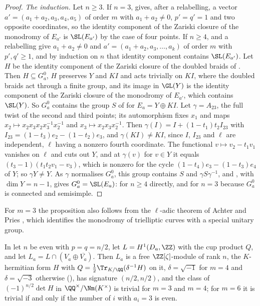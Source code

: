 \begin{proof}
\emph{The induction.} Let $n\ge3$. If $n=3$,  gives,
after a relabelling, a vector $a'=(a_{1}+a_{2},a_{3},a_{4},a_{5})$ of order $m$
with $a_{1}+a_{2}\ne0$, $p'=q'=1$ and two opposite coordinates, so the
identity component of the Zariski closure of the monodromy of $E_{a'}$ is
$\SL(E_{a'})$ by the case of four points. If $n\ge4$,  and
a relabelling give $a_{1}+a_{2}\ne0$ and $a'=(a_{1}+a_{2},a_{3},\dots,a_{k})$
of order $m$ with $p',q'\ge1$, and by induction on $n$ that identity
component contains $\SL(E_{a'})$. Let $H$ be the identity component of the
Zariski closure of the doubled braids of . Then
$H\subseteq G_{a}^{0}$, $H$ preserves $Y$ and $KI$ and acts trivially on
$KI$, where the doubled braids act through a finite group, and its image in
$\GL(Y)$ is the identity component of the Zariski closure of the monodromy of
$E_{a'}$, which contains $\SL(Y)$. So $G_{a}^{0}$ contains the group $S$ of
 for $E_{a}=Y\oplus KI$. Let $\gamma=A_{23}$, the full
twist of the second and third points; its automorphism fixes $x_{1}$ and
maps $x_{2}\mapsto x_{2}x_{3}x_{2}x_{3}^{-1}x_{2}^{-1}$ and $x_{3}\mapsto
x_{2}x_{3}x_{2}^{-1}$. Then $\gamma(I)=I+(1-t_{1})t_{2}I_{23}$ with
$I_{23}=(1-t_{3})e_{2}-(1-t_{2})e_{3}$, and $\gamma(KI)\ne KI$, since $I$,
$I_{23}$ and $\ell$ are independent, $\ell$ having a nonzero fourth
coordinate. The functional $v\mapsto v_{2}-t_{1}v_{1}$ vanishes on $\ell$ and
cuts out $Y$, and at $\gamma(v)$ for $v\in Y$ it equals
$(t_{3}-1)(t_{1}t_{2}v_{1}-v_{3})$, which is nonzero for the cycle
$(1-t_{4})e_{3}-(1-t_{3})e_{4}$ of $Y$; so $\gamma Y\ne Y$. As $\gamma$
normalises $G_{a}^{0}$, this group contains $S$ and $\gamma S\gamma^{-1}$,
and , with $\dim Y=n-1$, gives
$G_{a}^{0}=\SL(E_{a})$: for $n\ge4$ directly, and for $n=3$ because
$G_{a}^{0}$ is connected and semisimple.
\end{proof}

For $m=3$ the proposition also follows from the $\ell$-adic theorem of
Achter and Pries \cite[Corollary~3.10]{AP07}, which identifies the monodromy
of trielliptic curves with a special unitary group.

\begin{lemma}\label{lem:newdisc}
In  let $n$ be even with $p=q=n/2$, let
$L=H^{1}(D_{a},\ZZ)$ with the cup product $Q$, and let
$L_{a}=L\cap(V_{a}\oplus\overline{V_{a}})$. Then $L_{a}$ is a free
$\ZZ[\zeta]$-module of rank $n$, the $K$-hermitian form $H$ with
$Q=\tfrac12\Tr_{K/\QQ}(\delta^{-1}H)$ on it, $\delta=\sqrt{-1}$ for $m=4$ and
$\delta=\sqrt{-3}$ otherwise (\cite[Lemma~4.5]{paperI}), has signature
$(n/2,n/2)$, and the class of $(-1)^{n/2}\det H$ in
$\QQ^{\times}/\Nm(K^{\times})$ is trivial for $m=3$ and $m=4$; for $m=6$ it is
trivial if and only if the number of $i$ with $a_{i}=3$ is even.
\end{lemma}

